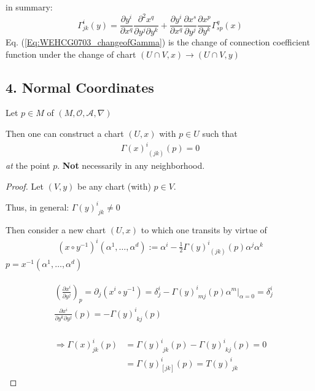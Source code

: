 \documentclass[10pt]{amsart}
\begin{document}
\begin{multicols*}{2}
	in summary:
	\begin{equation}\label{Eq:WEHCG0703_changeofGamma}
	\Gamma^i_{jk}(y) = \frac{ \partial y^i}{ \partial x^q} \frac{ \partial^2 x^q}{ \partial y^j \partial y^k} + \frac{ \partial y^i}{ \partial x^q } \frac{ \partial x^s }{ \partial y^j} \frac{ \partial x^p }{ \partial y^k} \Gamma^q_{sp}(x)
	\end{equation}
	Eq. (\ref{Eq:WEHCG0703_changeofGamma}) is the change of connection coefficient function under the change of chart $(U\cap V,x) \to (U\cap V,y)$
	
	
	\subsection*{4. Normal Coordinates}
	
Let $p \in M$ of $(M, \mathcal{O}, \mathcal{A}, \nabla)$

Then one can construct a chart $(U,x)$ with $p\in U$ such that 
\[
\begin{gathered}
	\Gamma(x)^i_{\,\, (jk)}(p) = 0
\end{gathered} 
\]
\emph{at} the point $p$. \textbf{Not} necessarily in any neighborhood.

\begin{proof}
Let $(V,y)$ be any chart (with) $p\in V$.

Thus, in general: $\Gamma(y)^i_{\,\, jk} \neq 0$

Then consider a new chart $(U, x)$ to which one transits by virtue of 
\[
\begin{gathered}
(x\circ y^{-1})^{i}(\alpha^1, \dots, \alpha^d) := \alpha^i - \frac{1}{2} \Gamma(y)^i_{\,\, (jk)}(p) \alpha^j \alpha^k 
\end{gathered}
\]
$p = x^{-1}(\alpha^1, \dots , \alpha^d)$

\[
\begin{gathered}
\begin{aligned} 
	& \left(\frac{\partial x^i}{ \partial y^j}\right)_p = \partial_j (x^i \circ y^{-1}) = \delta^i_j - \Gamma(y)^i_{\,\, mj}(p) \left. \alpha^m \right|_{\alpha = 0} = \delta^i_j \\
	& \frac{\partial x^i}{ \partial y^k \partial y^j}(p) = - \Gamma(y)^i_{ \, \, kj} (p)
\end{aligned} 
\end{gathered}
\]

\[
\begin{gathered}
\begin{aligned} 
\Longrightarrow \Gamma(x)^i_{jk}(p) & = \Gamma(y)^i_{\,\, jk}(p)  -  \Gamma(y)^i_{\,\,kj}(p) = 0  \\
	& = \Gamma(y)^i_{[jk]}(p) = T(y)^i_{\,\,jk}
\end{aligned} 
\end{gathered}
\]


\end{proof}
\end{multicols*}
\end{document}
